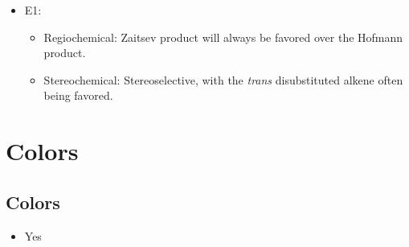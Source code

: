 \documentclass[12pt,a4paper]{article}
\begin{document}
\begin{itemize}
\begin{itemize}
\begin{itemize}
\begin{itemize}
                    \end{itemize}
            \end{itemize}
        \item E1:
            \begin{itemize}
                \item Regiochemical: Zaitsev product will always be favored over the Hofmann product.
                \item Stereochemical: Stereoselective, with the \textit{trans} disubstituted alkene often being favored.
            \end{itemize}
    \end{itemize}
\end{itemize}

\clearpage
\section{Colors}
\subsection{Colors}
\begin{itemize}
    \item Yes
\end{itemize}
\end{document}
